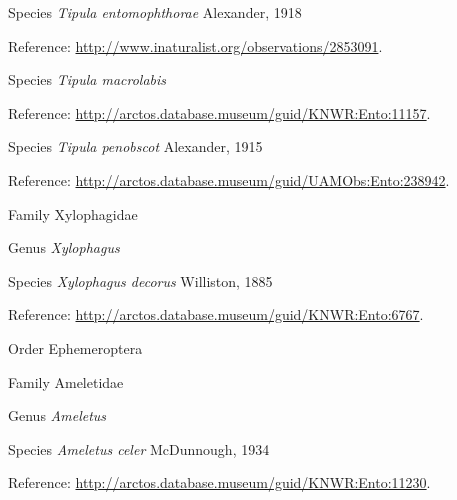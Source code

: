 \documentclass[9pt, article]{memoir}
\begin{document}
\begin{multicols}{2}
\vspace{6pt}\noindent\hspace{36pt}Species \textit{Tipula entomophthorae} Alexander, 1918


\vspace{6pt}Reference: 
\url{http://www.inaturalist.org/observations/2853091}.

\vspace{6pt}\noindent\hspace{36pt}Species \textit{Tipula macrolabis}


\vspace{6pt}Reference: 
\url{http://arctos.database.museum/guid/KNWR:Ento:11157}.

\vspace{6pt}\noindent\hspace{36pt}Species \textit{Tipula penobscot} Alexander, 1915


\vspace{6pt}Reference: 
\url{http://arctos.database.museum/guid/UAMObs:Ento:238942}.

\vspace{6pt}\noindent\hspace{24pt}Family Xylophagidae


\vspace{6pt}\noindent\hspace{30pt}Genus \textit{Xylophagus}


\vspace{6pt}\noindent\hspace{36pt}Species \textit{Xylophagus decorus} Williston, 1885


\vspace{6pt}Reference: 
\url{http://arctos.database.museum/guid/KNWR:Ento:6767}.

\vspace{6pt}\noindent\hspace{18pt}Order Ephemeroptera


\vspace{6pt}\noindent\hspace{24pt}Family Ameletidae


\vspace{6pt}\noindent\hspace{30pt}Genus \textit{Ameletus}


\vspace{6pt}\noindent\hspace{36pt}Species \textit{Ameletus celer} McDunnough, 1934


\vspace{6pt}Reference: 
\url{http://arctos.database.museum/guid/KNWR:Ento:11230}.


\end{multicols}
\end{document}
